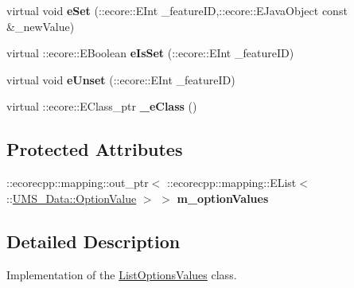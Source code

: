 \begin{DoxyCompactItemize}
\item 
\hypertarget{classUMS__Data_1_1ListOptionsValues_a1f637823ec0d2aca5170fdcc853276bf}{
virtual void {\bfseries eSet} (::ecore::EInt \_\-featureID,::ecore::EJavaObject const \&\_\-newValue)}
\label{classUMS__Data_1_1ListOptionsValues_a1f637823ec0d2aca5170fdcc853276bf}

\item 
\hypertarget{classUMS__Data_1_1ListOptionsValues_a726dc956660844553fc95d49c9ba742c}{
virtual ::ecore::EBoolean {\bfseries eIsSet} (::ecore::EInt \_\-featureID)}
\label{classUMS__Data_1_1ListOptionsValues_a726dc956660844553fc95d49c9ba742c}

\item 
\hypertarget{classUMS__Data_1_1ListOptionsValues_aa95f3a3ee5f6f07253f75f5f625fc3cb}{
virtual void {\bfseries eUnset} (::ecore::EInt \_\-featureID)}
\label{classUMS__Data_1_1ListOptionsValues_aa95f3a3ee5f6f07253f75f5f625fc3cb}

\item 
\hypertarget{classUMS__Data_1_1ListOptionsValues_a3dfc22d52eccc5b74d5b12fb0f3bc2e2}{
virtual ::ecore::EClass\_\-ptr {\bfseries \_\-eClass} ()}
\label{classUMS__Data_1_1ListOptionsValues_a3dfc22d52eccc5b74d5b12fb0f3bc2e2}

\end{DoxyCompactItemize}
\subsection*{Protected Attributes}
\begin{DoxyCompactItemize}
\item 
\hypertarget{classUMS__Data_1_1ListOptionsValues_a0c26009b0180981cc00ce081c351bfc7}{
::ecorecpp::mapping::out\_\-ptr$<$ ::ecorecpp::mapping::EList$<$ ::\hyperlink{classUMS__Data_1_1OptionValue}{UMS\_\-Data::OptionValue} $>$ $>$ {\bfseries m\_\-optionValues}}
\label{classUMS__Data_1_1ListOptionsValues_a0c26009b0180981cc00ce081c351bfc7}

\end{DoxyCompactItemize}


\subsection{Detailed Description}
Implementation of the \hyperlink{classUMS__Data_1_1ListOptionsValues}{ListOptionsValues} class. 

